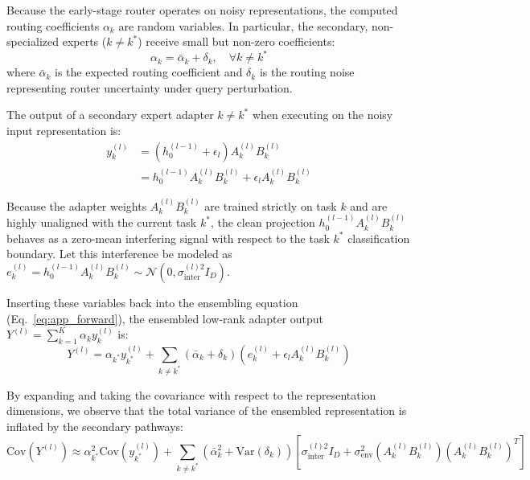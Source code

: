 \documentclass{article}
\theoremstyle{plain}
\theoremstyle{definition}
\theoremstyle{remark}
\begin{document}
Because the early-stage router operates on noisy representations, the computed routing coefficients $\alpha_k$ are random variables. In particular, the secondary, non-specialized experts ($k \neq k^*$) receive small but non-zero coefficients:
\begin{equation}
\alpha_k = \bar{\alpha}_k + \delta_k, \quad \forall k \neq k^*
\label{eq:app_coeff_noise}
\end{equation}
where $\bar{\alpha}_k$ is the expected routing coefficient and $\delta_k$ is the routing noise representing router uncertainty under query perturbation.

The output of a secondary expert adapter $k \neq k^*$ when executing on the noisy input representation is:
\begin{align}
y_k^{(l)} &= (h_0^{(l-1)} + \epsilon_l) A_k^{(l)} B_k^{(l)} \nonumber \\
&= h_0^{(l-1)} A_k^{(l)} B_k^{(l)} + \epsilon_l A_k^{(l)} B_k^{(l)}
\label{eq:app_expert_out}
\end{align}

Because the adapter weights $A_k^{(l)} B_k^{(l)}$ are trained strictly on task $k$ and are highly unaligned with the current task $k^*$, the clean projection $h_0^{(l-1)} A_k^{(l)} B_k^{(l)}$ behaves as a zero-mean interfering signal with respect to the task $k^*$ classification boundary. Let this interference be modeled as $e_k^{(l)} = h_0^{(l-1)} A_k^{(l)} B_k^{(l)} \sim \mathcal{N}(0, \sigma_{\text{inter}}^{(l)2} I_D)$.

Inserting these variables back into the ensembling equation (Eq.~\ref{eq:app_forward}), the ensembled low-rank adapter output $Y^{(l)} = \sum_{k=1}^K \alpha_k y_k^{(l)}$ is:
\begin{equation}
Y^{(l)} = \alpha_{k^*} y_{k^*}^{(l)} + \sum_{k \neq k^*} (\bar{\alpha}_k + \delta_k) \left( e_k^{(l)} + \epsilon_l A_k^{(l)} B_k^{(l)} \right)
\label{eq:app_dense_sum}
\end{equation}

By expanding and taking the covariance with respect to the representation dimensions, we observe that the total variance of the ensembled representation is inflated by the secondary pathways:
\begin{equation}
\text{Cov}\left( Y^{(l)} \right) \approx \alpha_{k^*}^2 \text{Cov}(y_{k^*}^{(l)}) + \sum_{k \neq k^*} \left( \bar{\alpha}_k^2 + \text{Var}(\delta_k) \right) \left[ \sigma_{\text{inter}}^{(l)2} I_D + \sigma_{\text{env}}^2 (A_k^{(l)} B_k^{(l)}) (A_k^{(l)} B_k^{(l)})^T \right]
\label{eq:app_covariance}
\end{equation}
\end{document}
